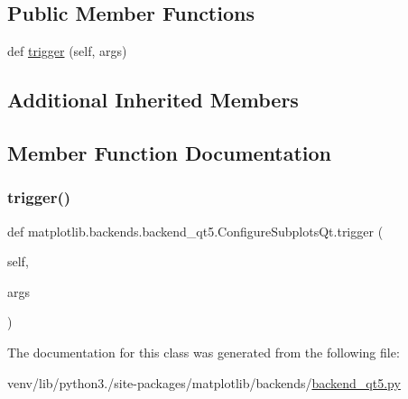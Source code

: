 \subsection*{Public Member Functions}
\begin{DoxyCompactItemize}
\item 
def \hyperlink{classmatplotlib_1_1backends_1_1backend__qt5_1_1ConfigureSubplotsQt_a01ec5aa11ccbb9132464da3de2ba5ca0}{trigger} (self, args)
\end{DoxyCompactItemize}
\subsection*{Additional Inherited Members}


\subsection{Member Function Documentation}
\mbox{\label{classmatplotlib_1_1backends_1_1backend__qt5_1_1ConfigureSubplotsQt_a01ec5aa11ccbb9132464da3de2ba5ca0}} 
\subsubsection{\texorpdfstring{trigger()}{trigger()}}
{\footnotesize\ttfamily def matplotlib.\+backends.\+backend\+\_\+qt5.\+Configure\+Subplots\+Qt.\+trigger (\begin{DoxyParamCaption}\item[{}]{self,  }\item[{}]{args }\end{DoxyParamCaption})}



The documentation for this class was generated from the following file\+:\begin{DoxyCompactItemize}
\item 
venv/lib/python3./site-\/packages/matplotlib/backends/\hyperlink{backend__qt5_8py}{backend\+\_\+qt5.\+py}\end{DoxyCompactItemize}

